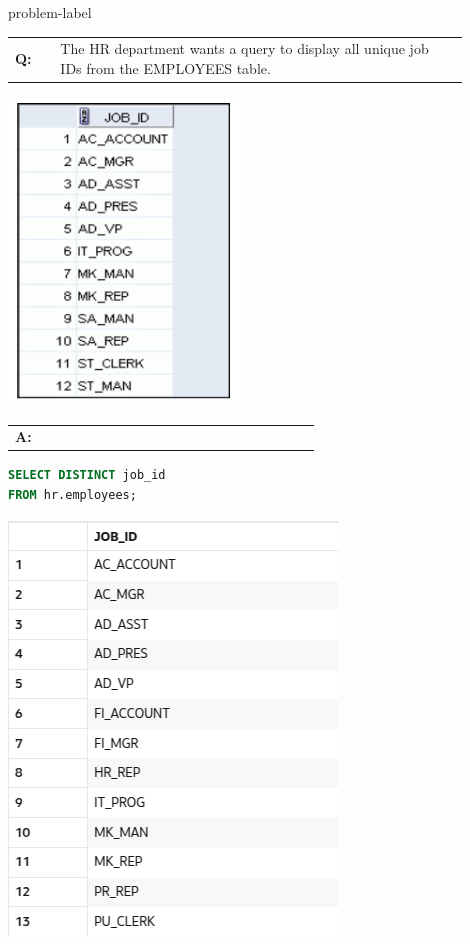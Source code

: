 \begin{problem}{}{problem-label}

\begin{tabular}{@{}l p{0.9\linewidth}@{}}
  \textbf{Q:} & The HR department wants a query to display all unique job IDs from the EMPLOYEES table.
\end{tabular}

\begin{center}
  \includegraphics[scale=0.7]{images/c1q07.png}
\end{center}

\vspace{1em}

\begin{tabular}{@{}l p{0.9\linewidth}@{}}
  \textbf{A:} &
\end{tabular}

\begin{lstlisting}[language=SQL]
SELECT DISTINCT job_id
FROM hr.employees;
    \end{lstlisting}

\vspace{1em}

\begin{center}
  \includegraphics[scale=0.5]{images/c1a9.png}
\end{center}


\end{problem}


